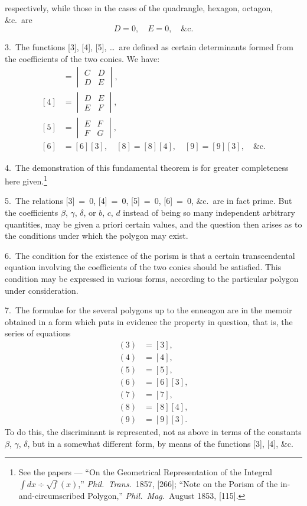 \documentclass[11pt,a4paper]{book}
\begin{document}
respectively, while those in the cases of the quadrangle, hexagon, octagon, \&c.\ are
\[
D=0,\quad E=0,\quad \text{\&c.}
\]

\newpage
\setcounter{page}{311}

3.\ The functions [3], [4], [5], \dots\ are defined as certain determinants formed from the coefficients of the two conics. We have:
\begin{align*}
[3] &= \begin{vmatrix} C & D \\ D & E \end{vmatrix},\\
[4] &= \begin{vmatrix} D & E \\ E & F \end{vmatrix},\\
[5] &= \begin{vmatrix} E & F \\ F & G \end{vmatrix},\\
[6] &= [6][3],\quad [8]=[8][4],\quad [9]=[9][3],\quad \text{\&c.}
\end{align*}

4.\ The demonstration of this fundamental theorem is for greater completeness here given.\footnote{See the papers --- ``On the Geometrical Representation of the Integral $\int dx\div\surd f(x)$,'' \textit{Phil.\ Trans.}\ 1857, [266]; ``Note on the Porism of the in-and-circumscribed Polygon,'' \textit{Phil.\ Mag.}\ August 1853, [115].}

5.\ The relations [3]~=~0, [4]~=~0, [5]~=~0, [6]~=~0, \&c.\ are in fact prime. But the coefficients $\beta$, $\gamma$, $\delta$, or $b$, $c$, $d$ instead of being so many independent arbitrary quantities, may be given a priori certain values, and the question then arises as to the conditions under which the polygon may exist.

\newpage
\setcounter{page}{312}

6.\ The condition for the existence of the porism is that a certain transcendental equation involving the coefficients of the two conics should be satisfied. This condition may be expressed in various forms, according to the particular polygon under consideration.

7.\ The formulae for the several polygons up to the enneagon are in the memoir obtained in a form which puts in evidence the property in question, that is, the series of equations
\begin{align*}
(3) &= [3],\\
(4) &= [4],\\
(5) &= [5],\\
(6) &= [6][3],\\
(7) &= [7],\\
(8) &= [8][4],\\
(9) &= [9][3].
\end{align*}
To do this, the discriminant is represented, not as above in terms of the constants $\beta$, $\gamma$, $\delta$, but in a somewhat different form, by means of the functions [3], [4], \&c.
\end{document}
